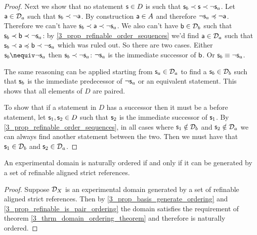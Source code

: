 \documentclass[11pt,letterpaper,fleqn]{memoir} %
\begin{document}
\begin{mathSection}
\begin{proof}
	Next we show that no statement $\stmt \in D$ is such that $\stmt_b \snarrower \stmt \snarrower \NOT \stmt_a$. Let $\stmt[a] \in \edomain_a$ such that $\stmt_b \snarrower \NOT \stmt[a]$. By construction $\stmt[a] \in A$ and therefore $\NOT \stmt_a \narrower \NOT \stmt[a]$. Therefore we can't have $\stmt_b \snarrower \stmt[a] \snarrower \NOT \stmt_a$. We also can't have $\stmt[b] \in \edomain_b$ such that $\stmt_b \snarrower \stmt[b] \snarrower \NOT \stmt_a$: by \ref{3_prop_refinable_order_sequences} we'd find $\stmt[a] \in \edomain_a$ such that $\stmt_b \snarrower \stmt[a] \narrower \stmt[b] \snarrower \NOT \stmt_a$ which was ruled out. So there are two cases. Either $\stmt_b \nequiv \NOT \stmt_a$ then $\stmt_b \snarrower \NOT \stmt_a$: $\NOT \stmt_a$ is the immediate successor of $\stmt[b]$. Or $\stmt_b \equiv \NOT \stmt_a$.
	
	The same reasoning can be applied starting from $\stmt_a \in \edomain_a$ to find a $\stmt_b \in \edomain_b$ such that $\stmt_b$ is the immediate predecessor of $\NOT \stmt_a$ or an equivalent statement. This shows that all elements of $D$ are paired.
	
	To show that if a statement in $D$ has a successor then it must be a before statement, let $\stmt_1, \stmt_2 \in D$ such that $\stmt_2$ is the immediate successor of $\stmt_1$. By \ref{3_prop_refinable_order_sequences}, in all cases where $\stmt_1 \notin \edomain_b$ and $\stmt_2 \notin \edomain_a$ we can always find another statement between the two. Then we must have that $\stmt_1 \in \edomain_b$ and $\stmt_2 \in \edomain_a$.
\end{proof}

\begin{thrm}\label{3_thrm_reference_ordering}
	An experimental domain is naturally ordered if and only if it can be generated by a set of refinable aligned strict references.
\end{thrm}
\begin{proof}
	Suppose $\edomain_X$ is an experimental domain generated by a set of refinable aligned strict references. Then by \ref{3_prop_basis_generate_ordering} and \ref{3_prop_refinable_is_pair_ordering} the domain satisfies the requirement of theorem \ref{3_thrm_domain_ordering_theorem} and therefore is naturally ordered.
	

\end{proof}
\end{mathSection}
\end{document}
